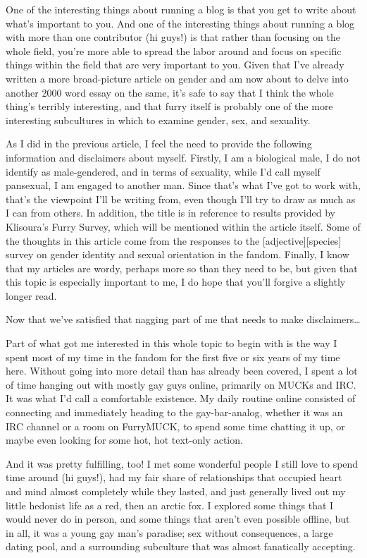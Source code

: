 
One of the interesting things about running a blog is that you get to write about what's important to you. And one of the interesting things about running a blog with more than one contributor (hi guys!) is that rather than focusing on the whole field, you're more able to spread the labor around and focus on specific things within the field that are very important to you. Given that I've already written a more broad-picture article on gender and am now about to delve into another 2000 word essay on the same, it's safe to say that I think the whole thing's terribly interesting, and that furry itself is probably one of the more interesting subcultures in which to examine gender, sex, and sexuality.

As I did in the previous article, I feel the need to provide the following information and disclaimers about myself. Firstly, I am a biological male, I do not identify as male-gendered, and in terms of sexuality, while I'd call myself pansexual, I am engaged to another man. Since that's what I've got to work with, that's the viewpoint I'll be writing from, even though I'll try to draw as much as I can from others. In addition, the title is in reference to results provided by Klisoura's Furry Survey, which will be mentioned within the article itself. Some of the thoughts in this article come from the responses to the {[}adjective{]}{[}species{]} survey on gender identity and sexual orientation in the fandom. Finally, I know that my articles are wordy, perhaps more so than they need to be, but given that this topic is especially important to me, I do hope that you'll forgive a slightly longer read.

Now that we've satisfied that nagging part of me that needs to make disclaimers\ldots{}

Part of what got me interested in this whole topic to begin with is the way I spent most of my time in the fandom for the first five or six years of my time here. Without going into more detail than has already been covered, I spent a lot of time hanging out with mostly gay guys online, primarily on MUCKs and IRC. It was what I'd call a comfortable existence. My daily routine online consisted of connecting and immediately heading to the gay-bar-analog, whether it was an IRC channel or a room on FurryMUCK, to spend some time chatting it up, or maybe even looking for some hot, hot text-only action.

And it was pretty fulfilling, too! I met some wonderful people I still love to spend time around (hi guys!), had my fair share of relationships that occupied heart and mind almost completely while they lasted, and just generally lived out my little hedonist life as a red, then an arctic fox. I explored some things that I would never do in person, and some things that aren't even possible offline, but in all, it was a young gay man's paradise; sex without consequences, a large dating pool, and a surrounding subculture that was almost fanatically accepting.

